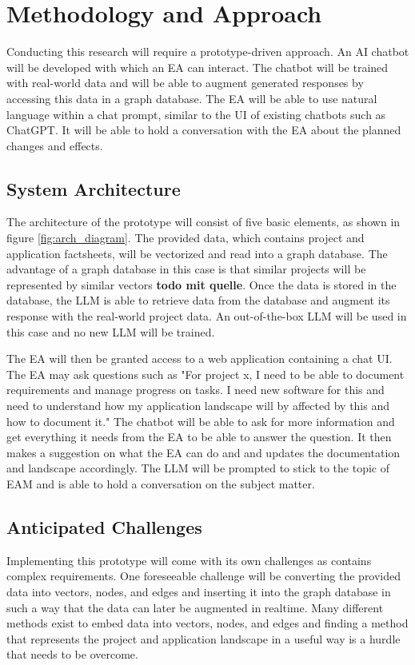 \documentclass[english]{lni}
\begin{document}
\section{Methodology and Approach}
Conducting this research will require a prototype-driven approach. An AI chatbot will be developed with which an EA can interact. The chatbot will be trained with real-world data and will be able to augment generated responses by accessing this data in a graph database. The EA will be able to use natural language within a chat prompt, similar to the UI of existing chatbots such as ChatGPT. It will be able to hold a conversation with the EA about the planned changes and effects.

\subsection{System Architecture}
The architecture of the prototype will consist of five basic elements, as shown in figure \ref{fig:arch_diagram}. The provided data, which contains project and application factsheets, will be vectorized and read into a graph database. The advantage of a graph database in this case is that similar projects will be represented by similar vectors \textbf{todo mit quelle}. Once the data is stored in the database, the LLM is able to retrieve data from the database and augment its response with the real-world project data. An out-of-the-box LLM will be used in this case and no new LLM will be trained.

The EA will then be granted access to a web application containing a chat UI. The EA may ask questions such as "For project x, I need to be able to document requirements and manage progress on tasks. I need new software for this and need to understand how my application landscape will by affected by this and how to document it." The chatbot will be able to ask for more information and get everything it needs from the EA to be able to answer the question. It then makes a suggestion on what the EA can do and and updates the documentation and landscape accordingly. The LLM will be prompted to stick to the topic of EAM and is able to hold a conversation on the subject matter.

\subsection{Anticipated Challenges}
Implementing this prototype will come with its own challenges as contains complex requirements. One foreseeable challenge will be converting the provided data into vectors, nodes, and edges and inserting it into the graph database in such a way that the data can later be augmented in realtime. Many different methods exist to embed data into vectors, nodes, and edges and finding a method that represents the project and application landscape in a useful way is a hurdle that needs to be overcome.\cite{grohe2020word2vec}
\end{document}
